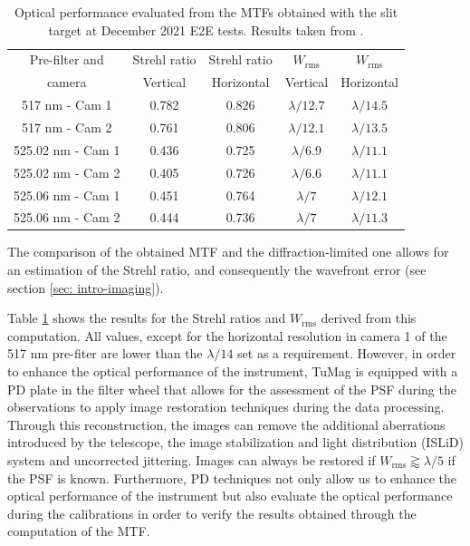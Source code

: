 \begin{table}[t]
    \centering
   \begin{tabular}{ccccc}
    \hline
    \hline
    Pre-filter and & Strehl ratio & Strehl ratio & $W_{\text{rms}}$& $W_{\text{rms}}$\\
    camera & Vertical & Horizontal & Vertical & Horizontal\\
    \hline
    517 nm - Cam 1 & 0.782 & 0.826 & $\lambda/12.7$ & $\lambda/14.5$ \\
    517 nm - Cam 2 & 0.761 & 0.806 & $\lambda/12.1$ & $\lambda/13.5$ \\
    525.02 nm - Cam 1 & 0.436 & 0.725 & $\lambda/6.9$ & $\lambda/11.1$ \\
    525.02 nm - Cam 2 & 0.405 & 0.726 & $\lambda/6.6$ & $\lambda/11.1$ \\
    525.06 nm - Cam 1 & 0.451 & 0.764 & $\lambda/7$ & $\lambda/12.1$ \\
    525.06 nm - Cam 2 & 0.444 & 0.736 & $\lambda/7$ & $\lambda/11.3$ \\
    \hline
    \hline
    \end{tabular}
    \caption{Optical performance evaluated from the MTFs obtained with the slit target at December 2021 E2E tests. Results taken from \citep{e2e-tests-inta}.}
    \label{table: Optical-performance}
\end{table}


The comparison of the obtained MTF and the diffraction-limited one allows for an estimation of the Strehl ratio, and consequently the wavefront error (see section \ref{sec: intro-imaging}).

Table \ref{table: Optical-performance} shows the results for the Strehl ratios and $W_{\text{rms}}$ derived from this computation. All values, except for the horizontal resolution in camera 1 of the 517 nm pre-fiter are lower than the $\lambda/14$ set as a requirement. However, in order to enhance the optical performance of the instrument, TuMag is equipped with a PD plate in the filter wheel that allows for the assessment of the PSF during the observations to apply image restoration techniques during the data processing. Through this reconstruction, the images can remove the additional aberrations introduced by the telescope, the image stabilization and light distribution (ISLiD) system and uncorrected jittering. Images can always be restored if $W_{\text{rms}} \gtrapprox \lambda / 5$ \citep{vargas_tesis} if the PSF is known. Furthermore, PD techniques not only allow us to enhance the optical performance of the instrument but also evaluate the optical performance during the calibrations in order to verify the results obtained through the computation of the MTF. 

